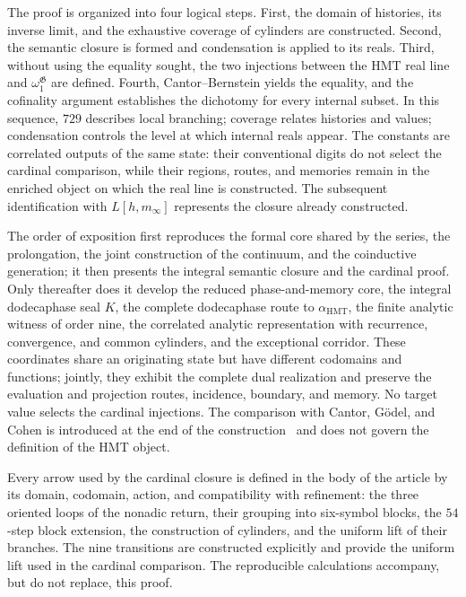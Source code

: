 The proof is organized into four logical steps. First, the domain of histories,
its inverse limit, and the exhaustive coverage of cylinders are constructed.
Second, the semantic closure is formed and condensation is applied to its
reals. Third, without using the equality sought, the two injections between
the HMT real line and \(\omega_1^{\mathfrak G}\) are defined. Fourth,
Cantor--Bernstein yields the equality, and the cofinality argument establishes
the dichotomy for every internal subset. In this sequence, \(729\) describes
local branching; coverage relates histories and values; condensation controls
the level at which internal reals appear. The constants are correlated
outputs of the same state: their conventional digits do not select the
cardinal comparison, while their regions, routes, and memories remain in the
enriched object on which the real line is constructed. The subsequent
identification with \(L[h,m_\infty]\) represents the closure already
constructed.

The order of exposition first reproduces the formal core shared by the series,
the prolongation, the joint construction of the continuum, and the coinductive
generation; it then presents the integral semantic closure and the cardinal
proof. Only thereafter does it develop the reduced phase-and-memory core, the
integral dodecaphase seal \(K\), the complete dodecaphase route to
\(\alpha_{\mathrm{HMT}}\), the finite analytic witness of order nine, the
correlated analytic representation with recurrence, convergence, and common
cylinders, and the exceptional corridor. These coordinates share an originating
state but have different codomains and functions; jointly, they exhibit the
complete dual realization and preserve the evaluation and projection routes, incidence,
boundary, and memory. No target value selects the cardinal injections. The
comparison with Cantor, Gödel, and Cohen is introduced at the end of the
construction~\cite{Cantor1878,Hilbert1902,Godel1938,Cohen1963,Cohen1964} and
does not govern the definition of the HMT object.

\enlargethispage{2\baselineskip}
Every arrow used by the cardinal closure is defined in the body of the article
by its domain, codomain, action, and compatibility with refinement: the three
oriented loops of the nonadic return, their grouping into six-symbol blocks,
the \(54\)-step block extension, the construction of cylinders, and the uniform
lift of their branches. The nine transitions are constructed explicitly and
provide the uniform lift used in the cardinal comparison. The reproducible
calculations accompany, but do not replace, this proof.

